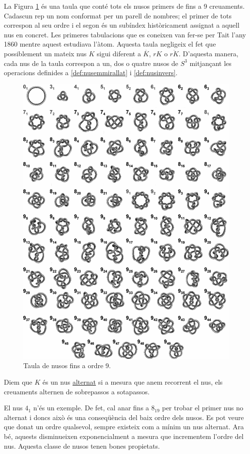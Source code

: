 La Figura \ref{fig:knotable} és una taula que conté tots els nusos primers de fins a 9 creuaments. Cadascun rep un nom conformat per un parell de nombres; el primer de tots correspon al seu ordre i el segon és un subíndex històricament assignat a aquell nus en concret. Les primeres tabulacions que es coneixen van fer-se per Tait l'any 1860 mentre aquest estudiava l'àtom. Aquesta taula negligeix el fet que possiblement un mateix nus $K$ sigui diferent a $\overline{K}$, $rK$ o $\overline{rK}$. D'aquesta manera, cada nus de la taula correspon a un, dos o quatre nusos de $S^3$ mitjançant les operacions definides a \ref{def:nusemmirallat} i \ref{def:nusinvers}.

\begin{figure}
	\centering
	\includegraphics[width=0.9\linewidth]{img/knottable.png}
	\caption{Taula de nusos fins a ordre 9.}\label{fig:knotable}
\end{figure}

\begin{definition}\label{def:nusalternat}
	Diem que $K$ és un nus \underline{alternat} si a mesura que anem recorrent el nus, els creuaments alternen de sobrepassos a sotapassos.
\end{definition}

El nus $4_1$ n'és un exemple. De fet, cal anar fins a $8_{19}$ per trobar el primer nus no alternat i doncs això és una conseqüència del baix ordre dels nusos. Es pot veure que donat un ordre qualsevol, sempre existeix com a mínim un nus alternat. Ara bé, aquests disminueixen exponencialment a mesura que incrementem l'ordre del nus. Aquesta classe de nusos tenen bones propietats.